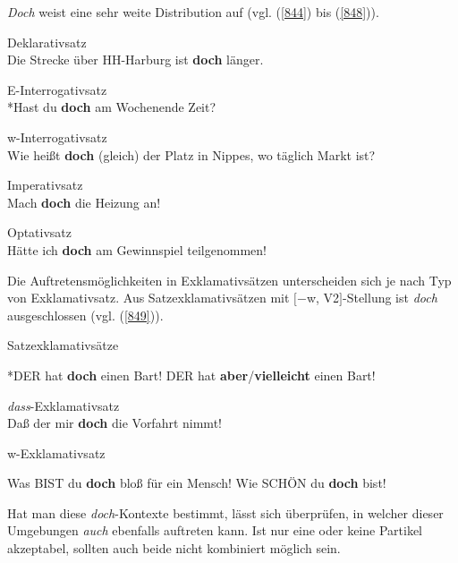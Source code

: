 {\noindent
\textit{Doch} weist eine sehr weite Distribution auf (vgl. (\ref{844}) bis (\ref{848})).

\begin{exe}
	\ex\label{844} Deklarativsatz\\
	Die Strecke über HH-Harburg ist \textbf{doch} länger.
\end{exe}

\begin{exe}
	\ex\label{845} E-Interrogativsatz\\
	*Hast du \textbf{doch} am Wochenende Zeit?
\end{exe}	
	
\begin{exe}
	\ex\label{846} w-Interrogativsatz\\
	Wie heißt \textbf{doch} (gleich) der Platz in Nippes, wo täglich Markt ist?
\end{exe}		
	
\begin{exe}
	\ex\label{847} Imperativsatz\\
	Mach \textbf{doch} die Heizung an!
\end{exe}	
		
\begin{exe}
	\ex\label{848} Optativsatz\\
	Hätte ich \textbf{doch} am Gewinnspiel teilgenommen!
\end{exe}		
Die Auftretensmöglichkeiten in Exklamativsätzen unterscheiden sich je nach Typ von Exklamativsatz. Aus Satzexklamativsätzen mit $[\minus$w, V2$]$-Stellung ist \textit{doch} ausgeschlossen (vgl. (\ref{849})).
	
\begin{exe}
	\ex\label{849}Satzexklamativsätze\\[-1.25em]
		\begin{xlist}	
			\ex\label{849a} *DER hat \textbf{doch} einen Bart!
			\ex\label{849b} DER hat \textbf{aber}/\textbf{vielleicht} einen Bart!	
			\hfill\hbox {\citet[218]{Rinas2006}}
		\end{xlist}
\end{exe}	
	
\begin{exe}
	\ex\label{850}\textit{dass}-Exklamativsatz\\
	Daß der mir \textbf{doch} die Vorfahrt nimmt!
	\newline
	\hbox{}\hfill\hbox {\citet[152]{Zaefferer1988}}
\end{exe}
	
\begin{exe}
	\ex\label{851}w-Exklamativsatz\\[-1.25em] 
		\begin{xlist}	
			\ex\label{851a} Was BIST du \textbf{doch} bloß für ein Mensch!
			\ex\label{851b} Wie SCHÖN du \textbf{doch} bist!	
			\hfill\hbox {\citet[218-219]{Rinas2006}}
		\end{xlist}
\end{exe}		
Hat man diese \textit{doch}-Kontexte bestimmt, lässt sich überprüfen, in welcher dieser Umgebungen \textit{auch} ebenfalls auftreten kann. Ist nur eine oder keine Partikel akzeptabel, sollten auch beide nicht kombiniert möglich sein.

}
